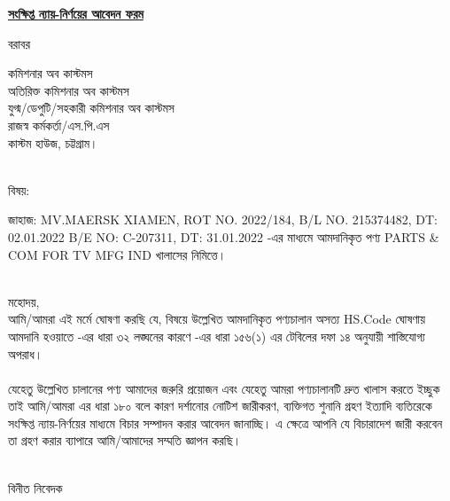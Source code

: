 \documentclass[12pt]{article}
\newcommand{\good}{PARTS \& COM FOR TV MFG IND}
\newcommand{\vessel}{MV.MAERSK XIAMEN}
\newcommand{\blno}{215374482}
\newcommand{\bldt}{02.01.2022}
\newcommand{\beno}{C-207311}
\newcommand{\bedt}{31.01.2022}
\newcommand{\menifest}{2022/184}
\begin{document}
\begin{center}
\textbf{\underline{সংক্ষিপ্ত ন্যায়-নির্ণয়ের আবেদন ফরম}}
\end{center}

\noindent
বরাবর
\\
\begin{minipage}[t]{0.06\linewidth}
\hspace{1em}
\end{minipage}
\begin{minipage}[t]{0.94\linewidth}
কমিশনার অব কাস্টমস
\\
অতিরিক্ত কমিশনার অব কাস্টমস
\\
যুগ্ম/ডেপুটি/সহকারী কমিশনার অব কাস্টমস
\\
রাজস্ব কর্মকর্তা/এস.পি.এস
\\
কাস্টম হাউজ,
চট্টগ্রাম।
\\
\\
\end{minipage}
\begin{minipage}[t]{0.06\linewidth}
বিষয়:
\end{minipage}
\begin{minipage}[t]{0.94\linewidth}
জাহাজ: {\vessel},
ROT NO. {\menifest},
B/L NO. {\blno},
DT: {\bldt}
B/E NO: {\beno}, DT: {\bedt}
-এর মাধ্যমে আমদানিকৃত পণ্য
{\good}
খালাসের নিমিত্তে।
\\
\\
\end{minipage}
মহোদয়,
\\
\hspace*{2.7em}আমি/আমরা এই মর্মে
ঘোষণা করছি যে, বিষয়ে উল্লেখিত আমদানিকৃত পণ্যচালান অসত্য
HS.Code
ঘোষণায়  আমদানি হওয়াতে
{\tca} -এর ধারা ৩২ লঙ্ঘনের কারণে
{\tca} -এর ধারা ১৫৬(১) এর টেবিলের দফা ১৪ অনুযায়ী
শাস্তিযোগ্য অপরাধ।
\\
\\
\hspace*{2.7em}
যেহেতু উল্লেখিত চালানের পণ্য আমাদের জরুরি প্রয়োজন
এবং যেহেতু আমরা পণ্যচালানটি দ্রুত খালাস করতে ইচ্ছুক
তাই আমি/আমরা {\tca} এর ধারা ১৮০ বলে কারণ দর্শানোর
নোটিশ জারীকরণ, ব্যক্তিগত শুনানি গ্রহণ ইত্যাদি ব্যতিরেকে
সংক্ষিপ্ত ন্যায়-নির্ণয়ের মাধ্যমে বিচার সম্পাদন করার আবেদন
জানাচ্ছি।
এ ক্ষেত্রে আপনি যে বিচারাদেশ জারী করবেন তা গ্রহণ করার
ব্যাপারে আমি/আমাদের সম্মতি জ্ঞাপন করছি।
\\
\\
\begin{minipage}[t]{0.55\linewidth}
\hspace{1em}
\end{minipage}
\begin{minipage}[t]{0.45\linewidth}
বিনীত নিবেদক
\\
\\
\\
\end{minipage}
\end{document}

